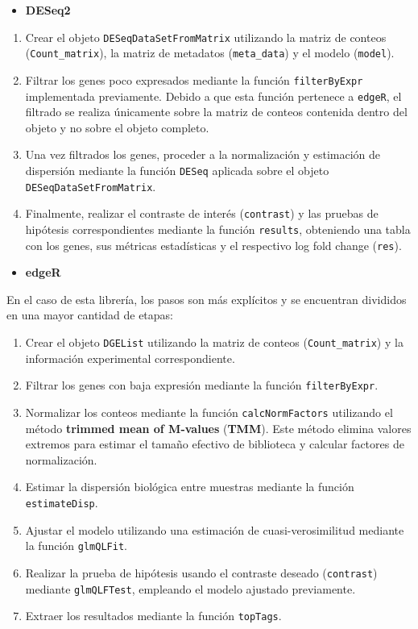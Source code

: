 \documentclass[
  10pt,
]{article}
\providecommand{\tightlist}{%
  \setlength{\itemsep}{0pt}\setlength{\parskip}{0pt}}
\begin{document}
\begin{itemize}
\tightlist
\item
  \textbf{DESeq2}
\end{itemize}

\begin{enumerate}
\def\labelenumi{\arabic{enumi}.}
\item
  Crear el objeto \texttt{DESeqDataSetFromMatrix} utilizando la matriz
  de conteos (\texttt{Count\_matrix}), la matriz de metadatos
  (\texttt{meta\_data}) y el modelo (\texttt{model}).
\item
  Filtrar los genes poco expresados mediante la función
  \texttt{filterByExpr} implementada previamente. Debido a que esta
  función pertenece a \texttt{edgeR}, el filtrado se realiza únicamente
  sobre la matriz de conteos contenida dentro del objeto y no sobre el
  objeto completo.
\item
  Una vez filtrados los genes, proceder a la normalización y estimación
  de dispersión mediante la función \texttt{DESeq} aplicada sobre el
  objeto \texttt{DESeqDataSetFromMatrix}.
\item
  Finalmente, realizar el contraste de interés (\texttt{contrast}) y las
  pruebas de hipótesis correspondientes mediante la función
  \texttt{results}, obteniendo una tabla con los genes, sus métricas
  estadísticas y el respectivo log fold change (\texttt{res}).
\end{enumerate}

\begin{itemize}
\tightlist
\item
  \textbf{edgeR}
\end{itemize}

En el caso de esta librería, los pasos son más explícitos y se
encuentran divididos en una mayor cantidad de etapas:

\begin{enumerate}
\def\labelenumi{\arabic{enumi}.}
\item
  Crear el objeto \texttt{DGEList} utilizando la matriz de conteos
  (\texttt{Count\_matrix}) y la información experimental
  correspondiente.
\item
  Filtrar los genes con baja expresión mediante la función
  \texttt{filterByExpr}.
\item
  Normalizar los conteos mediante la función \texttt{calcNormFactors}
  utilizando el método \textbf{trimmed mean of M-values} (\textbf{TMM}).
  Este método elimina valores extremos para estimar el tamaño efectivo
  de biblioteca y calcular factores de normalización.
\item
  Estimar la dispersión biológica entre muestras mediante la función
  \texttt{estimateDisp}.
\item
  Ajustar el modelo utilizando una estimación de cuasi-verosimilitud
  mediante la función \texttt{glmQLFit}.
\item
  Realizar la prueba de hipótesis usando el contraste deseado
  (\texttt{contrast}) mediante \texttt{glmQLFTest}, empleando el modelo
  ajustado previamente.
\item
  Extraer los resultados mediante la función \texttt{topTags}.
\end{enumerate}
\end{document}
